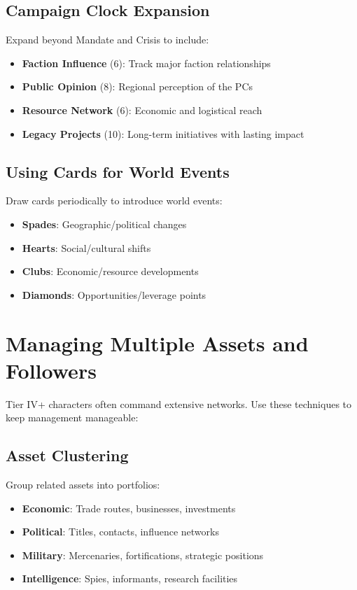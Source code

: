 \subsection*{Campaign Clock Expansion}

Expand beyond Mandate and Crisis to include:

\begin{itemize}
    \item \textbf{Faction Influence} (6): Track major faction relationships
    \item \textbf{Public Opinion} (8): Regional perception of the PCs
    \item \textbf{Resource Network} (6): Economic and logistical reach
    \item \textbf{Legacy Projects} (10): Long-term initiatives with lasting impact
\end{itemize}

\subsection*{Using Cards for World Events}

Draw cards periodically to introduce world events:

\begin{itemize}
    \item \textbf{Spades}: Geographic/political changes
    \item \textbf{Hearts}: Social/cultural shifts
    \item \textbf{Clubs}: Economic/resource developments
    \item \textbf{Diamonds}: Opportunities/leverage points
\end{itemize}

\section{Managing Multiple Assets and Followers}

Tier IV+ characters often command extensive networks. Use these techniques to keep management manageable:

\subsection*{Asset Clustering}

Group related assets into portfolios:
\begin{itemize}
    \item \textbf{Economic}: Trade routes, businesses, investments
    \item \textbf{Political}: Titles, contacts, influence networks
    \item \textbf{Military}: Mercenaries, fortifications, strategic positions
    \item \textbf{Intelligence}: Spies, informants, research facilities
\end{itemize}

